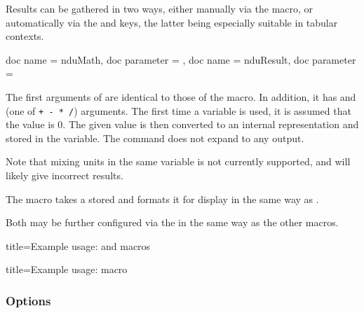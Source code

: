 \documentclass{article}
\begin{document}
Results can be gathered in two ways, either manually via the  macro, or automatically via the  and  keys, the latter being especially suitable in tabular contexts.

\begin{docCommands}[]{
	{
		doc name = nduMath,
		doc parameter = 
	},
	{
		doc name = nduResult,
		doc parameter = 
	}
}

The first arguments of  are identical to those of the  macro. In addition, it has  and  (one of \texttt{+ - * /}) arguments. The first time a variable is used, it is assumed that the value is 0. The given value is then converted to an internal representation and stored in the variable. The command does not expand to any output.

Note that mixing units in the same variable is not currently supported, and will likely give incorrect results.

The  macro takes a stored  and formats it for display in the same way as .

Both may be further configured via the  in the same way as the other macros.

\begin{dispExample*}{
	title=Example usage:  and  macros
}
\end{dispExample*}

\begin{dispExample*}{
	title=Example usage:  macro
}
\begingroup
{}
\endgroup
\end{dispExample*}
\end{docCommands}

\clearpage
\subsubsection{Options}
\end{document}
